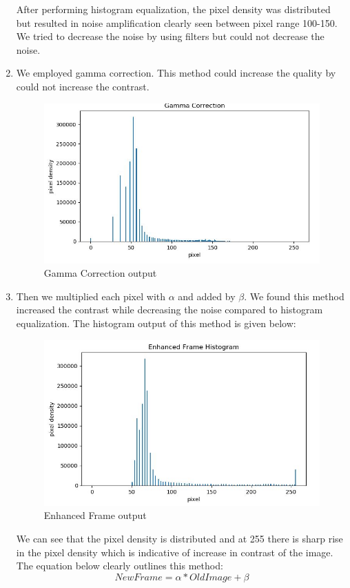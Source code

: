 \documentclass[12pt]{article}
\begin{document}
\begin{enumerate}
After performing histogram equalization, the pixel density was distributed but resulted in noise amplification clearly seen between pixel range 100-150. We tried to decrease the noise by using filters but could not decrease the noise.

\item We employed gamma correction. This method could increase the quality by could not increase the contrast.
\begin{figure}[h]
    \centering
    \includegraphics[width=12cm]{gammahist}
    \caption{Gamma Correction output}
    \label{fig:gammahist}
\end{figure}

\item Then we multiplied each pixel with $\alpha$ and added by $\beta$. We found this method increased the contrast while decreasing the noise compared to histogram equalization. The histogram output of this method is given below:

\begin{figure}[h]
    \centering
    \includegraphics[width=12cm]{enhancedhistogram}
    \caption{Enhanced Frame output}
    \label{fig:enhancedhistogram}
\end{figure}
We can see that the pixel density is distributed and at 255 there is sharp rise in the pixel density which is indicative of increase in contrast of the image. The equation below clearly outlines this method:
\begin{equation}
	NewFrame = \alpha*OldImage + \beta
\end{equation}
\end{enumerate}
\end{document}
